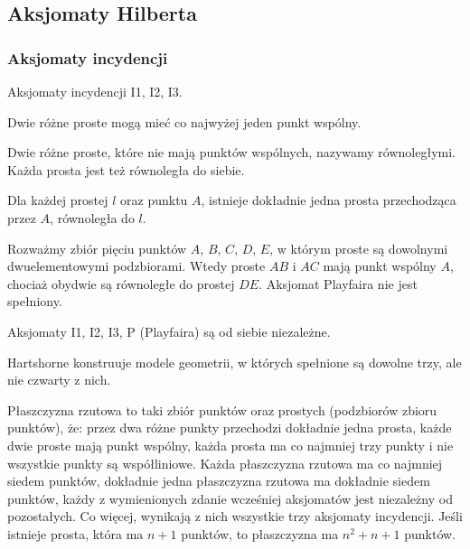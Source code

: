 %

\subsection{Aksjomaty Hilberta}
\subsubsection{Aksjomaty incydencji}
Aksjomaty incydencji I1, I2, I3.

\begin{proposition}
    Dwie różne proste mogą mieć co najwyżej jeden punkt wspólny.
\end{proposition}

\begin{definition}
    Dwie różne proste, które nie mają punktów wspólnych, nazywamy równoległymi.
    Każda prosta jest też równoległa do siebie.
\end{definition}

\begin{definition}
    Dla każdej prostej $l$ oraz punktu $A$, istnieje dokładnie jedna prosta przechodząca przez $A$, równoległa do $l$.
\end{definition}

\begin{example}
    Rozważmy zbiór pięciu punktów $A$, $B$, $C$, $D$, $E$, w którym proste są dowolnymi dwuelementowymi podzbiorami.
    Wtedy proste $AB$ i $AC$ mają punkt wspólny $A$, chociaż obydwie są równoległe do prostej $DE$.
    Aksjomat Playfaira nie jest spełniony.
\end{example}

\begin{proposition}
    Aksjomaty I1, I2, I3, P (Playfaira) są od siebie niezależne.
\end{proposition}

Hartshorne \cite[s. 69-70]{hartshorne2000} konstruuje modele geometrii, w których spełnione są dowolne trzy, ale nie czwarty z nich.

\begin{proposition}
    Płaszczyzna rzutowa to taki zbiór punktów oraz prostych (podzbiorów zbioru punktów), że: przez dwa różne punkty przechodzi dokładnie jedna prosta, każde dwie proste mają punkt wspólny, każda prosta ma co najmniej trzy punkty i nie wszystkie punkty są współliniowe.
    Każda płaszczyzna rzutowa ma co najmniej siedem punktów, dokładnie jedna płaszczyzna rzutowa ma dokładnie siedem punktów, każdy z wymienionych zdanie wcześniej aksjomatów jest niezależny od pozostałych.
    Co więcej, wynikają z nich wszystkie trzy aksjomaty incydencji.
    Jeśli istnieje prosta, która ma $n+1$ punktów, to płaszczyzna ma $n^2 + n + 1$ punktów.
\end{proposition} %


